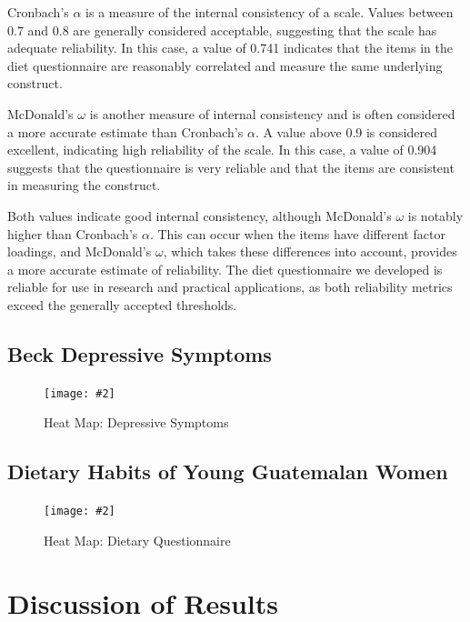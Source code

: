 \documentclass[jou]{apa7}
\newcommand{\includegraphicsmax}[2][]{%
	\texttt{[image: \#2]}%
}
\begin{document}
Cronbach's $\alpha$ is a measure of the internal consistency of a scale. Values between 0.7 and 0.8 are generally considered acceptable, suggesting that the scale has adequate reliability. In this case, a value of 0.741 indicates that the items in the diet questionnaire are reasonably correlated and measure the same underlying construct.

McDonald's $\omega$ is another measure of internal consistency and is often considered a more accurate estimate than Cronbach's $\alpha$. A value above 0.9 is considered excellent, indicating high reliability of the scale. In this case, a value of 0.904 suggests that the questionnaire is very reliable and that the items are consistent in measuring the construct.

Both values indicate good internal consistency, although McDonald's $\omega$ is notably higher than Cronbach's $\alpha$. This can occur when the items have different factor loadings, and McDonald's $\omega$, which takes these differences into account, provides a more accurate estimate of reliability. The diet questionnaire we developed is reliable for use in research and practical applications, as both reliability metrics exceed the generally accepted thresholds.


\subsection{Beck Depressive Symptoms}
\begin{figure}[!ht]
	\centering
	\includegraphicsmax{sintomasDepresivosBeckGraph.pdf}
	\caption{Heat Map: Depressive Symptoms}
	\label{fig:Figure2}
\end{figure}
\vspace{-1em} %

\subsection{Dietary Habits of Young Guatemalan Women}
\begin{figure}[!ht]
	\centering
	\includegraphicsmax{dietGraph.pdf}
	\caption{Heat Map: Dietary Questionnaire}
	\label{fig:Figure3}
\end{figure}

\section{Discussion of Results}\label{discusiuxf3n-de-resultados}
\end{document}
